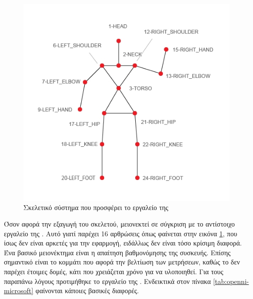 \begin{figure}[H]
    \centering
    \includegraphics[width=.7\textwidth, keepaspectratio]{fig/openni-skeleton.png}
    \caption{Σκελετικό σύστημα που προσφέρει το εργαλείο της }
    \label{fig:openni-skeleton}
\end{figure}

Όσον αφορά την εξαγωγή του σκελετού, μειονεκτεί σε σύγκριση με το αντίστοιχο εργαλείο της . Αυτό γιατί παρέχει 16 αρθρώσεις όπως φαίνεται στην εικόνα \ref{fig:openni-skeleton}, που ίσως δεν είναι αρκετές για την εφαρμογή, ειδάλλως δεν είναι τόσο κρίσιμη διαφορά. Ένα βασικό μειονέκτημα είναι η απαίτηση βαθμονόμησης της συσκευής. Επίσης σημαντικό είναι το κομμάτι που αφορά την βελτίωση των μετρήσεων, καθώς το  δεν παρέχει έτοιμες δομές, κάτι που χρειάζεται χρόνο για να υλοποιηθεί. Για τους παραπάνω λόγους προτιμήθηκε το εργαλείο της . Ενδεικτικά στον πίνακα \ref{tab:openni-microsoft} φαίνονται κάποιες βασικές διαφορές.

